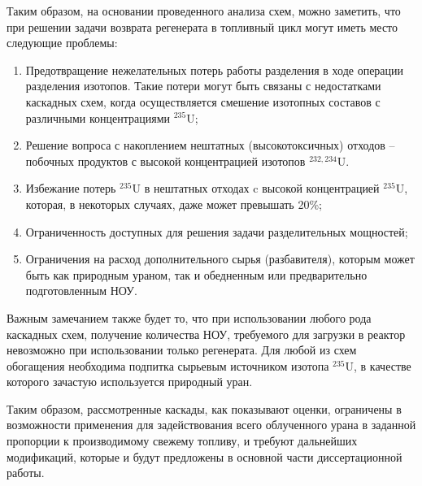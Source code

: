 Таким образом, на основании проведенного анализа схем, можно заметить, что при решении задачи возврата регенерата в топливный цикл могут иметь место следующие проблемы:
\begin{enumerate}
  \item Предотвращение нежелательных потерь работы разделения в ходе операции разделения изотопов. Такие потери могут быть связаны с недостатками каскадных схем, когда осуществляется смешение изотопных составов с различными концентрациями $^{235}$U; 
  \item Решение вопроса с накоплением нештатных (высокотоксичных) отходов -- побочных продуктов с высокой концентрацией изотопов $^{232,234}$U.
  \item Избежание потерь $^{235}$U  в нештатных отходах c высокой концентрацией $^{235}$U, которая, в некоторых случаях, даже может превышать 20\%;
  \item Ограниченность доступных для решения задачи разделительных мощностей;
  \item Ограничения на расход дополнительного сырья (разбавителя), которым может быть как природным ураном, так и обедненным или предварительно подготовленным НОУ.
\end{enumerate}

Важным замечанием также будет то, что при использовании любого рода каскадных схем, получение количества НОУ, требуемого для загрузки в реактор невозможно при использовании только регенерата. Для любой из схем обогащения необходима подпитка сырьевым источником изотопа $^{235}$U, в качестве которого зачастую используется природный уран.

Таким образом, рассмотренные каскады, как показывают оценки, ограничены в возможности применения для задействования всего облученного урана в заданной пропорции к производимому свежему топливу, и требуют дальнейших модификаций, которые и будут предложены в основной части диссертационной работы. 
